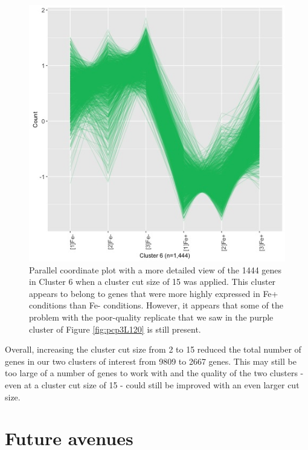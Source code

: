 \documentclass[11pt,a4paper,oldfontcommands,openany]{memoir}
\numberwithin{equation}{section} %
\begin{document}
\begin{figure}[H]
  \begin{framed}
  \centering
  \includegraphics[width=\textwidth]{L120_15_6}
  \end{framed}
  \caption{Parallel coordinate plot with a more detailed view of the 1444 genes in Cluster 6 when a cluster cut size of 15 was applied. This cluster appears to belong to genes that were more highly expressed in Fe+ conditions than Fe- conditions. However, it appears that some of the problem with the poor-quality replicate that we saw in the purple cluster of Figure \ref{fig:pcp3L120} is still present.}
  \label{fig:L120_15_6}
\end{figure}

Overall, increasing the cluster cut size from 2 to 15 reduced the total number of genes in our two clusters of interest from 9809 to 2667 genes. This may still be too large of a number of genes to work with and the quality of the two clusters - even at a cluster cut size of 15 - could still be improved with an even larger cut size.

\clearpage

\section{Future avenues}
\end{document}
